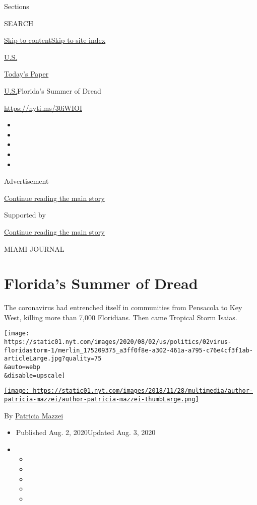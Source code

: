Sections

SEARCH

\protect\hyperlink{site-content}{Skip to
content}\protect\hyperlink{site-index}{Skip to site index}

\href{https://www.nytimes.com/section/us}{U.S.}

\href{https://myaccount.nytimes.com/auth/login?response_type=cookie\&client_id=vi}{}

\href{https://www.nytimes.com/section/todayspaper}{Today's Paper}

\href{/section/us}{U.S.}\textbar{}Florida's Summer of Dread

\url{https://nyti.ms/30iWIOI}

\begin{itemize}
\item
\item
\item
\item
\item
\end{itemize}

Advertisement

\protect\hyperlink{after-top}{Continue reading the main story}

Supported by

\protect\hyperlink{after-sponsor}{Continue reading the main story}

MIAMI JOURNAL

\hypertarget{floridas-summer-of-dread}{%
\section{Florida's Summer of Dread}\label{floridas-summer-of-dread}}

The coronavirus had entrenched itself in communities from Pensacola to
Key West, killing more than 7,000 Floridians. Then came Tropical Storm
Isaias.

\texttt{[image: https://static01.nyt.com/images/2020/08/02/us/politics/02virus-floridastorm-1/merlin\_175209375\_a3ff0f8e-a302-461a-a795-c76e4cf3f1ab-articleLarge.jpg?quality=75\\\&auto=webp\\\&disable=upscale]}

\href{https://www.nytimes.com/by/patricia-mazzei}{\texttt{[image: https://static01.nyt.com/images/2018/11/28/multimedia/author-patricia-mazzei/author-patricia-mazzei-thumbLarge.png]}}

By \href{https://www.nytimes.com/by/patricia-mazzei}{Patricia Mazzei}

\begin{itemize}
\item
  Published Aug. 2, 2020Updated Aug. 3, 2020
\item
  \begin{itemize}
  \item
  \item
  \item
  \item
  \item
  \end{itemize}
\end{itemize}

